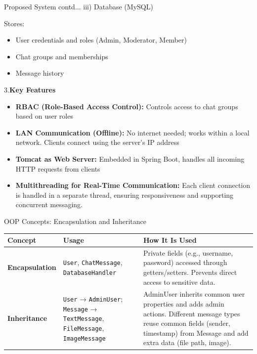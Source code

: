 \documentclass[aspectratio=1610]{beamer}
\begin{document}
\begin{frame}{Proposed System contd...}
\small
\vspace{0.2cm}
iii) Database (MySQL)
\vspace{0.2cm} 

Stores:
\begin{itemize}
   \item User credentials and roles (Admin, Moderator, Member)
   \item Chat groups and memberships
   \item Message history
\end{itemize}
3.\textbf{Key Features}
\vspace{0.2cm} 

\begin{itemize}
   \item \textbf{RBAC (Role-Based Access Control):} Controls access to chat groups based on user roles
   \item \textbf{LAN Communication (Offline):} No internet needed; works within a local network. Clients connect using the server's IP address
   \item \textbf{Tomcat as Web Server:} Embedded in Spring Boot, handles all incoming HTTP requests from clients
   \item \textbf{Multithreading for Real-Time Communication:} Each client connection is handled in a separate thread, ensuring responsiveness and supporting concurrent messaging.
\end{itemize}

\end{frame}
\begin{frame}{OOP Concepts: Encapsulation and Inheritance}
\small
\begin{tabular}{>{\bfseries}p{3cm} p{4cm} p{6cm}}
\toprule
Concept & Usage & How It Is Used \\
\midrule
Encapsulation & \texttt{User}, \texttt{ChatMessage}, \texttt{DatabaseHandler} & Private fields (e.g., username, password) accessed through getters/setters. Prevents direct access to sensitive data. \\
\addlinespace
Inheritance & \texttt{User} → \texttt{AdminUser}; \texttt{Message} → \texttt{TextMessage}, \texttt{FileMessage}, \texttt{ImageMessage} & AdminUser inherits common user properties and adds admin actions. Different message types reuse common fields (sender, timestamp) from Message and add extra data (file path, image). \\
\bottomrule
\end{tabular}
\end{frame}
\end{document}
